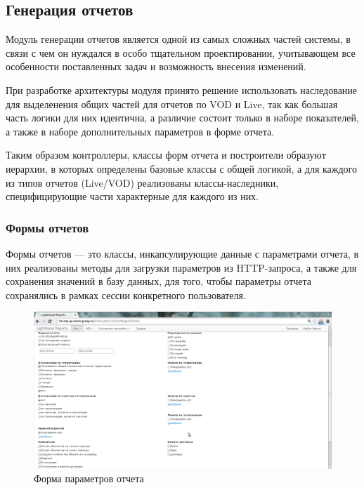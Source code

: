 \subsection{Генерация отчетов}
Модуль генерации отчетов является одной из самых сложных частей системы, в связи с чем
он нуждался в особо тщательном проектировании, учитывающем все особенности поставленных задач
и возможность внесения изменений.

При разработке архитектуры модуля принято решение использовать наследование
для выделенения общих частей для отчетов по VOD и Live, так как большая часть
логики для них идентична, а различие состоит только в наборе показателей, а также
в наборе дополнительных параметров в форме отчета.

Таким образом контроллеры, классы форм отчета и построители образуют иерархии, в которых
определены базовые классы с общей логикой, а для каждого из типов отчетов (Live/VOD) реализованы
классы-наследники, специфицирующие части характерные для каждого из них.

\subsubsection{Формы отчетов}
Формы отчетов --- это классы, инкапсулирующие данные с параметрами отчета, 
в них реализованы методы для загрузки параметров из HTTP-запроса, а также для
сохранения значений в базу данных, для того, чтобы параметры отчета сохранялись
в рамках сессии конкретного пользователя.

\begin{figure}[!ht]
\begin{center}
\vspace{-0.4cm}
\includegraphics[scale=0.5, trim=00mm 00mm 200mm 00mm, clip]{../resources/lm_screen.png}
\caption{Форма параметров отчета}
\label{gr:report_form}
\end{center} 
\end{figure}

